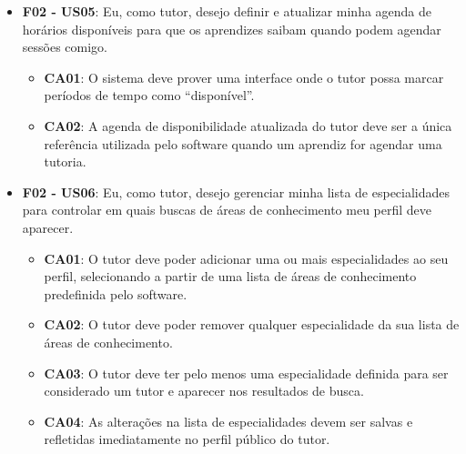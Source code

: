 \begin{itemize}
\begin{itemize}
\item \textbf{CA03}: O software deve permitir que o usuário altere sua localização (cidade e estado) a partir de uma lista predefinida.

\item \textbf{CA04}: Após salvar as alterações, todas elas devem ser refletidas imediatamente no perfil do usuário.

\end{itemize}

\item \textbf{F02 - US05}: Eu, como tutor, desejo definir e atualizar minha agenda de horários disponíveis para que os aprendizes saibam quando podem agendar sessões comigo.

\begin{itemize}

\item \textbf{CA01}: O sistema deve prover uma interface onde o tutor possa marcar períodos de tempo como ``disponível''.

\item \textbf{CA02}: A agenda de disponibilidade atualizada do tutor deve ser a única referência utilizada pelo software quando um aprendiz for agendar uma tutoria.

\end{itemize}

\item \textbf{F02 - US06}: Eu, como tutor, desejo gerenciar minha lista de especialidades para controlar em quais buscas de áreas de conhecimento meu perfil deve aparecer.

\begin{itemize}

\item \textbf{CA01}: O tutor deve poder adicionar uma ou mais especialidades ao seu perfil, selecionando a partir de uma lista de áreas de conhecimento predefinida pelo software.

\item \textbf{CA02}: O tutor deve poder remover qualquer especialidade da sua lista de áreas de conhecimento.

\item \textbf{CA03}: O tutor deve ter pelo menos uma especialidade definida para ser considerado um tutor e aparecer nos resultados de busca.

\item \textbf{CA04}: As alterações na lista de especialidades devem ser salvas e refletidas imediatamente no perfil público do tutor.


\end{itemize}
\end{itemize}
